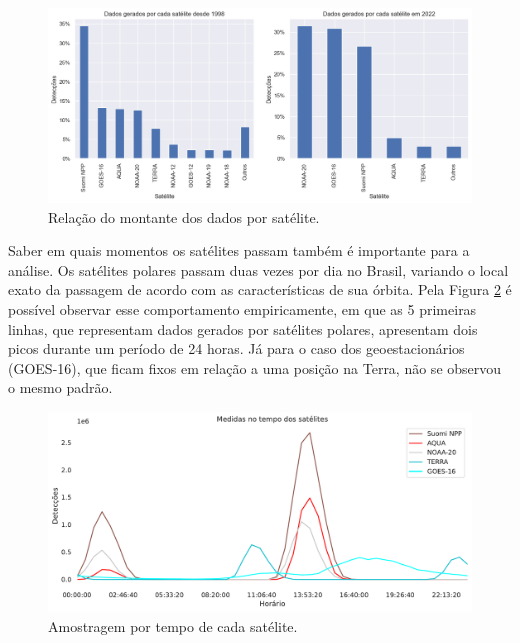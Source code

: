 \documentclass[cic,tc]{iiufrgs}
\begin{document}
\begin{figure}[H]
    \caption{Relação do montante dos dados por satélite.}
    \begin{center}
        \includegraphics[width=35em]{porcentagem_satelites}
    \end{center}
    \label{fig:porcentagem_satelites}
\end{figure}

Saber em quais momentos os satélites passam também é importante para a análise. Os satélites polares passam duas vezes por dia no Brasil, variando o local exato da passagem de acordo com as características de sua órbita. Pela Figura \ref{fig:tempo_medidas_satelites} é possível observar esse comportamento empiricamente, em que as 5 primeiras linhas, que representam dados gerados por satélites polares, apresentam dois picos durante um período de 24 horas. Já para o  caso dos geoestacionários (GOES-16), que ficam fixos em relação a uma posição na Terra, não se observou o mesmo padrão. \par

\begin{figure}[H]
    \caption{Amostragem por tempo de cada satélite.}
    \begin{center}
        \includegraphics[width=35em]{tempo_medidas_satelites}
    \end{center}
    \label{fig:tempo_medidas_satelites}
\end{figure}
\end{document}
